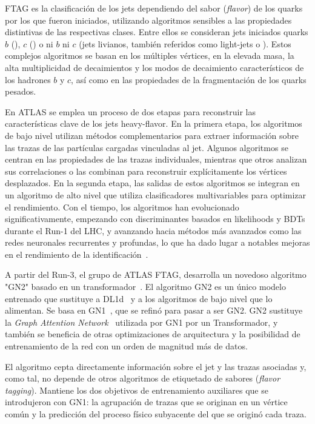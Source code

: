 \ac{FTAG} es la clasificación de los jets dependiendo del sabor (\textit{flavor}) de los quarks por los que fueron iniciados, utilizando algoritmos sensibles a las propiedades distintivas de las respectivas clases. Entre ellos se consideran jets iniciados quarks \(b\) (\bjets), \(c\) (\cjets) o ni \(b\) ni \(c\) (jets livianos, tambi\'en referidos como light-jets o \ljets).
Estos complejos algoritmos se basan en los múltiples vértices, en la elevada masa, la alta multiplicidad de decaimientos y los modos de decaimiento característicos de los hadrones \(b\) y \(c\), así como en las propiedades de la fragmentación de los quarks pesados.


En \ac{ATLAS} se emplea un proceso de dos etapas para reconstruir las características clave de los jets heavy-flavor. En la primera etapa, los algoritmos de bajo nivel utilizan métodos complementarios para extraer información sobre las trazas de las partículas cargadas vinculadas al jet. Algunos algoritmos se centran en las propiedades de las trazas individuales, mientras que otros analizan sus correlaciones o las combinan para reconstruir explícitamente los vértices desplazados. En la segunda etapa, las salidas de estos algoritmos se integran en un algoritmo de alto nivel que utiliza clasificadores multivariables para optimizar el rendimiento. Con el tiempo, los algoritmos han evolucionado significativamente, empezando con discriminantes basados en likelihoods y \acp{BDT} durante el Run-1 del \ac{LHC}, y avanzando hacia métodos más avanzados como las redes neuronales recurrentes y profundas, lo que ha dado lugar a notables mejoras en el rendimiento de la identificación~\cite{ATLAS-FTAG-Calibration-2012,ATLAS-FTAG-Efficiency-2012,MV2Algorithm,ATLAS-FTAG-DeepLearning}.

A partir del Run-3, el grupo de \ac{ATLAS} \ac{FTAG}, desarrolla un novedoso algoritmo "GN2" basado en un transformador~\cite{GN2Transformer}. El algoritmo GN2 es un único modelo entrenado que sustituye a DL1d~\cite{ATLAS-FTAG-DL1-Run2} y a los algoritmos de bajo nivel que lo alimentan. Se basa en GN1~\cite{ATLAS-FTAG-GN1}, que se refinó para pasar a ser GN2. GN2 sustituye la \textit{Graph Attention Network}~\cite{GANs} utilizada por GN1 por un Transformador, y también se beneficia de otras optimizaciones de arquitectura y la posibilidad de entrenamiento de la red con un orden de magnitud más de datos.

El algoritmo cepta directamente información sobre el jet y las trazas asociadas y, como tal, no depende de otros algoritmos de etiquetado de sabores (\textit{flavor tagging}). Mantiene los dos objetivos de entrenamiento auxiliares que se introdujeron con GN1: la agrupación de trazas que se originan en un vértice común y la predicción del proceso físico subyacente del que se originó cada traza.

